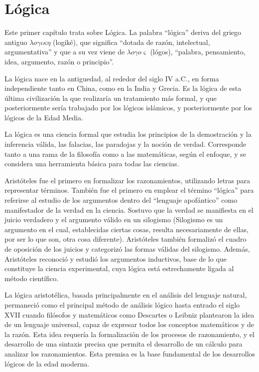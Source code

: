 
\chapter{Lógica}

Este primer capítulo trata sobre Lógica. La palabra ``lógica''
deriva del griego antiguo $\lambda o \gamma \iota \kappa \eta$
(logiké), que significa ``dotada
de razón, intelectual, argumentativa''  y que a su vez
viene de $\lambda o \gamma o \varsigma$ (lógos), ``palabra, pensamiento, idea, argumento,
razón o principio''.

La lógica nace en la antiguedad, al rededor del siglo IV a.C.,
en forma independiente tanto en China, como en la India y Grecia.
Es la lógica de esta última civilización la que realizaría un
tratamiento más formal, y que posteriormente sería trabajado por
los lógicos islámicos, y posteriormente por los lógicos de la Edad
Media.

La lógica es una ciencia formal que estudia los principios de la demostración
y la inferencia válida, las falacias, las paradojas y la noción de verdad.
Corresponde tanto a una rama de la filosofía como a las matemáticas, según el enfoque, y se considera una herramienta básica para todas las ciencias.

Aristóteles fue el primero en formalizar los razonamientos, utilizando letras para representar términos. También fue el primero en emplear el término ``lógica'' para referirse al estudio de los argumentos dentro del ``lenguaje apofántico'' como manifestador de la verdad en la ciencia. Sostuvo que la verdad se manifiesta en el juicio verdadero y el argumento válido en un silogismo (Silogismo es un argumento en el cual, establecidas ciertas cosas, resulta necesariamente de ellas, por ser lo que son, otra cosa diferente).  Aristóteles también formalizó el cuadro de oposición de los juicios y categorizó las formas válidas del silogismo. Además, Aristóteles reconoció y estudió los argumentos inductivos, base de lo que constituye la ciencia experimental, cuya lógica está estrechamente ligada al método científico.

La lógica aristotélica, basada principalmente en el análisis del lenguaje
natural, permaneció como el principal método de análisis lógico hasta entrado el siglo XVII cuando filósofos y matemáticos como Descartes o Leibniz plantearon la idea de un lenguaje universal, capaz de expresar todos los conceptos matemáticos y de la razón. Esta idea requería la formalización de
los procesos de razonamiento, y el desarrollo de una sintaxis precisa
que permita el desarrollo de un cálculo para analizar los razonamientos. Esta
premisa es la base fundamental de los desarrollos lógicos de la edad moderna.

